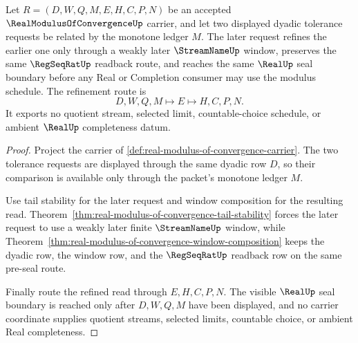 \begin{theorem}
\label{thm:real-modulus-of-convergence-monotone-window-refinement}
Let $R=(D,W,Q,M,E,H,C,P,N)$ be an accepted $\RealModulusOfConvergenceUp$ carrier, and let two displayed dyadic tolerance requests be related by the monotone ledger $M$. The later request refines the earlier one only through a weakly later $\StreamNameUp$ window, preserves the same $\RegSeqRatUp$ readback route, and reaches the same $\RealUp$ seal boundary before any Real or Completion consumer may use the modulus schedule. The refinement route is
$$
D,W,Q,M \longmapsto E \longmapsto H,C,P,N .
$$
It exports no quotient stream, selected limit, countable-choice schedule, or ambient $\RealUp$ completeness datum.
\end{theorem}
\begin{proof}
Project the carrier of \autoref{def:real-modulus-of-convergence-carrier}. The two tolerance requests are displayed through the same dyadic row $D$, so their comparison is available only through the packet's monotone ledger $M$.

Use tail stability for the later request and window composition for the resulting read. Theorem~\ref{thm:real-modulus-of-convergence-tail-stability} forces the later request to use a weakly later finite $\StreamNameUp$ window, while Theorem~\ref{thm:real-modulus-of-convergence-window-composition} keeps the dyadic row, the window row, and the $\RegSeqRatUp$ readback row on the same pre-seal route.

Finally route the refined read through $E,H,C,P,N$. The visible $\RealUp$ seal boundary is reached only after $D,W,Q,M$ have been displayed, and no carrier coordinate supplies quotient streams, selected limits, countable choice, or ambient Real completeness.
\end{proof}

